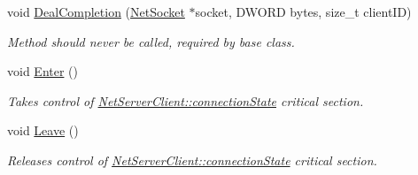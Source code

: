 \begin{DoxyCompactItemize}
void \hyperlink{class_net_server_client_a1326ff79039cc29bafe26a1c8839a215}{DealCompletion} (\hyperlink{class_net_socket}{NetSocket} $\ast$socket, DWORD bytes, size\_\-t clientID)
\begin{DoxyCompactList}\small\item\em Method should never be called, required by base class. \item\end{DoxyCompactList}\item 
\hypertarget{class_net_server_client_a1fa9d1ffada167f2f22771a421c62843}{
void \hyperlink{class_net_server_client_a1fa9d1ffada167f2f22771a421c62843}{Enter} ()}
\label{class_net_server_client_a1fa9d1ffada167f2f22771a421c62843}

\begin{DoxyCompactList}\small\item\em Takes control of \hyperlink{class_net_server_client_a7cf5767e011097703711ca704caba13d}{NetServerClient::connectionState} critical section. \item\end{DoxyCompactList}\item 
\hypertarget{class_net_server_client_a260109d41706644e3925922d1745b2b8}{
void \hyperlink{class_net_server_client_a260109d41706644e3925922d1745b2b8}{Leave} ()}
\label{class_net_server_client_a260109d41706644e3925922d1745b2b8}

\begin{DoxyCompactList}\small\item\em Releases control of \hyperlink{class_net_server_client_a7cf5767e011097703711ca704caba13d}{NetServerClient::connectionState} critical section. \item\end{DoxyCompactList}\end{DoxyCompactItemize}
